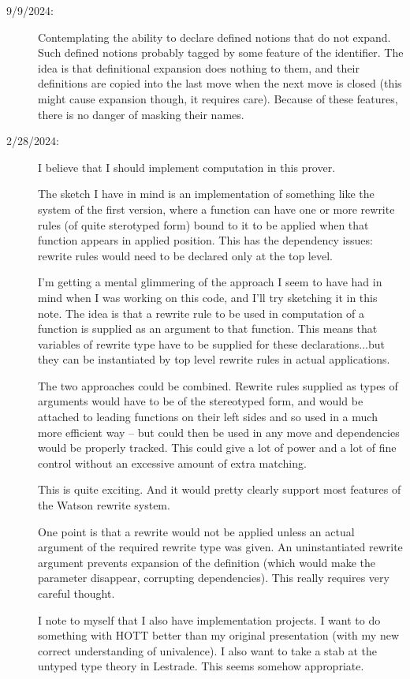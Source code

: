 \documentclass[12pt]{article}
\begin{document}
\begin{description}
\item[9/9/2024:]  Contemplating the ability to declare defined notions that do not expand.  Such defined notions probably tagged by some feature of the identifier.
The idea is that definitional expansion does nothing to them, and their definitions are copied into the last move when the next move is closed (this might cause expansion though, it requires care).   Because of these features, there is no danger of masking their names.

\item[2/28/2024:]  I believe that I should implement computation in this prover.

The sketch I have in mind is an implementation of something like the system of the first version,
where a function can have one or more rewrite rules (of quite sterotyped form) bound to it to be applied
when that function appears in applied position.  This has the dependency issues:  rewrite rules would need
to be declared only at the top level.

I'm getting a mental glimmering of the approach I seem to have had in mind when I was working on this
code, and I'll try sketching it in this note.  The idea is that a rewrite rule to be used in computation of a function
is supplied as an argument to that function.   This means that variables of rewrite type have to be supplied
for these declarations...but they can be instantiated by top level rewrite rules in actual applications.

The two approaches could be combined.  Rewrite rules supplied as types of arguments would have to be of the stereotyped
form, and would be attached to leading functions on their left sides and so used in a much more efficient way --
but could then be used in any move and dependencies would be properly tracked.   This could give a lot of power
and a lot of fine control without an excessive amount of extra matching.

This is quite exciting.  And it would pretty clearly support most features of the Watson rewrite system.

One point is that a rewrite would not be applied unless an actual argument of the required rewrite type was given.
An uninstantiated rewrite argument prevents expansion of the definition (which would make the parameter disappear,
corrupting dependencies).  This really requires very careful thought.

I note to myself that I also have implementation projects.  I want to do something with HOTT better than my original presentation (with my new correct understanding of univalence).  I also want to take a stab at the untyped type theory in Lestrade.  This seems somehow appropriate.


\end{description}
\end{document}
